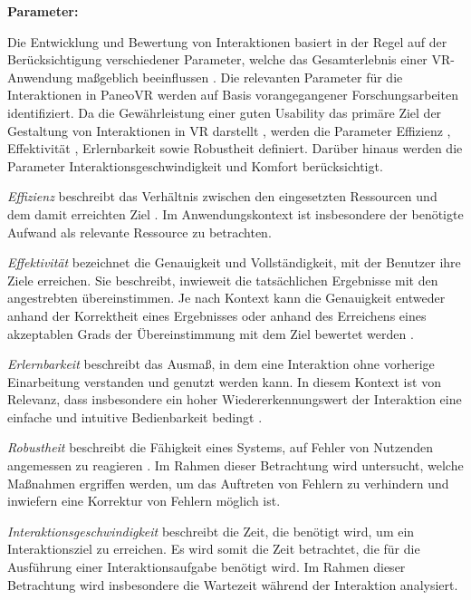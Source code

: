 {\normalfont \bfseries Parameter:} 


Die Entwicklung und Bewertung von Interaktionen basiert in der Regel auf der Berücksichtigung verschiedener Parameter, welche das Gesamterlebnis einer VR-Anwendung maßgeblich beeinflussen \citep{10.1145/3441852.3471230}. Die relevanten Parameter für die Interaktionen in PaneoVR werden auf Basis vorangegangener Forschungsarbeiten identifiziert. Da die Gewährleistung einer guten Usability das primäre Ziel der Gestaltung von Interaktionen in VR darstellt \citep{dorner_virtual_2019}, werden die Parameter Effizienz \citep{DINISO9241-11}, Effektivität \citep{DINISO9241-11}, Erlernbarkeit \citep{DINISO9241-110} sowie Robustheit \citep{DINISO9241-110} definiert. Darüber hinaus werden die Parameter Interaktionsgeschwindigkeit \citep{COOK2015117} und Komfort \citep{jerald_vr_2016} berücksichtigt. 

\textit{Effizienz} beschreibt das Verhältnis zwischen den eingesetzten Ressourcen und dem damit erreichten Ziel \citep{DINISO9241-11}. Im Anwendungskontext ist  insbesondere der benötigte Aufwand als relevante Ressource zu betrachten.

\textit{Effektivität} bezeichnet die Genauigkeit und Vollständigkeit, mit der Benutzer ihre Ziele erreichen. Sie beschreibt, inwieweit die tatsächlichen Ergebnisse mit den angestrebten übereinstimmen. Je nach Kontext kann die Genauigkeit entweder anhand der Korrektheit eines Ergebnisses oder anhand des Erreichens eines akzeptablen Grads der Übereinstimmung mit dem Ziel bewertet werden \citep{DINISO9241-11}.

\textit{Erlernbarkeit} beschreibt das Ausmaß, in dem eine Interaktion ohne vorherige Einarbeitung verstanden und genutzt werden kann. In diesem Kontext ist von Relevanz, dass insbesondere ein hoher Wiedererkennungswert der Interaktion eine einfache und intuitive Bedienbarkeit bedingt \citep{jerald_vr_2016}.

\textit{Robustheit} beschreibt die Fähigkeit eines Systems, auf Fehler von Nutzenden angemessen zu reagieren \citep{DINISO9241-110}. Im Rahmen dieser Betrachtung wird untersucht, welche Maßnahmen ergriffen werden, um das Auftreten von Fehlern zu verhindern und inwiefern eine Korrektur von Fehlern möglich ist.

\textit{Interaktionsgeschwindigkeit} beschreibt die Zeit, die benötigt wird, um ein Interaktionsziel zu erreichen. Es wird somit die Zeit betrachtet, die für die Ausführung einer Interaktionsaufgabe benötigt wird. Im Rahmen dieser Betrachtung wird insbesondere die Wartezeit während der Interaktion analysiert.  

